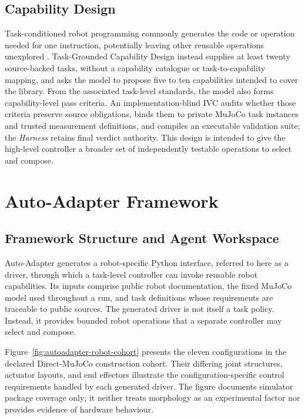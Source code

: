 \subsection{Capability Design}

Task-conditioned robot programming commonly generates the code or operation
needed for one instruction, potentially leaving other reusable operations
unexplored \citep{liang2023codeaspolicies,mu2024robocodex}. Task-Grounded
Capability Design instead supplies at least twenty source-backed tasks, without
a capability catalogue or task-to-capability mapping, and asks the model to
propose five to ten capabilities intended to cover the library. From the
associated task-level standards, the model also forms capability-level pass
criteria. An implementation-blind IVC audits whether those criteria preserve
source obligations, binds them to private MuJoCo task instances and trusted
measurement definitions, and compiles an executable validation suite; the
\emph{Harness} retains final verdict authority. This design is intended to give
the high-level controller a broader set of independently testable operations
to select and compose.

\section{Auto-Adapter Framework}

\subsection{Framework Structure and Agent Workspace}

Auto-Adapter generates a robot-specific Python interface, referred to here as
a driver, through which a task-level controller can invoke reusable robot
capabilities. Its inputs comprise public robot documentation, the fixed MuJoCo
model used throughout a run, and task definitions whose requirements are
traceable to public sources. The generated driver is not itself a task policy.
Instead, it provides bounded robot operations that a separate controller may
select and compose.

Figure~\ref{fig:autoadapter-robot-cohort} presents the eleven configurations in
the declared Direct-MuJoCo construction cohort. Their differing joint
structures, actuator layouts, and end effectors illustrate the
configuration-specific control requirements handled by each generated driver.
The figure documents simulator package coverage only; it neither treats
morphology as an experimental factor nor provides evidence of hardware
behaviour.

